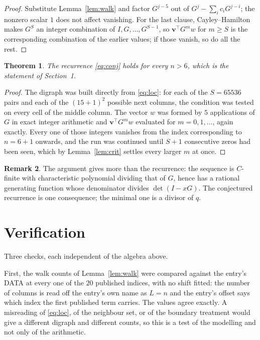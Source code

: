 \documentclass[11pt,a4paper]{article}
\theoremstyle{plain}
\newtheorem{theorem}{Theorem}
\theoremstyle{definition}
\newtheorem{remark}[theorem]{Remark}
\begin{document}
\begin{proof}
Substitute Lemma~\ref{lem:walk} and factor $G^{j-5}$ out of
$G^{j}-\sum_ic_iG^{j-i}$; the nonzero scalar $1$ does not affect
vanishing. For the last clause, Cayley--Hamilton makes $G^{S}$ an integer combination of
$I,G,\dots,G^{S-1}$, so $\mathbf{v}^{\!\top}G^{m}w$ for $m\ge S$ is the corresponding
combination of the earlier values; if those vanish, so do all the rest.
\end{proof}

\begin{theorem}
The recurrence \eqref{eq:conj} holds for every $n>6$, which is the statement of
Section~1.
\end{theorem}

\begin{proof}
The digraph was built directly from \eqref{eq:loc}: for each of the $S=65536$ pairs and each
of the $(15+1)^{2}$ possible next columns, the condition was tested on every cell of
the middle column. The vector $w$ was formed by $5$ applications of $G$ in exact integer
arithmetic and $\mathbf{v}^{\!\top}G^{m}w$ evaluated for $m=0,1,\dots$, again exactly.
Every one of those integers vanishes from the index corresponding to $n=6+1$ onwards,
and the run was continued until $S+1$ consecutive zeros had been seen, which by
Lemma~\ref{lem:crit} settles every larger $m$ at once.
\end{proof}

\begin{remark}
The argument gives more than the recurrence: the sequence is $C$-finite with characteristic
polynomial dividing that of $G$, hence has a rational generating function whose denominator
divides $\det(I-xG)$. The conjectured recurrence is one consequence; the minimal one is a
divisor of $q$.
\end{remark}

\section{Verification}

Three checks, each independent of the algebra above.

First, the walk counts of Lemma~\ref{lem:walk} were compared against the entry's DATA at
every one of the $20$ published indices, with no shift fitted: the number of columns is
read off the entry's own name as $L=n$ and the entry's offset says which index the first
published term carries. The values agree exactly. A misreading of \eqref{eq:loc}, of the
neighbour set, or of the boundary treatment would give a different digraph and different
counts, so this is a test of the modelling and not only of the arithmetic.
\end{document}
